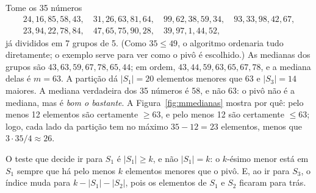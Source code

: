 \begin{exemplo}\label{ex:mmedianas}
Tome os 35 números
\[
\begin{array}{c}
24,16,85,58,43,\quad 31,26,63,81,64,\quad 99,62,38,59,34,\quad 93,33,98,42,67,\\
23,94,22,78,84,\quad 47,65,75,90,28,\quad 39,97,1,44,52,
\end{array}
\]
já divididos em 7 grupos de 5. (Como $35\le49$, o algoritmo ordenaria tudo diretamente; o exemplo serve para ver como o pivô é escolhido.) As medianas dos grupos são $43,63,59,67,78,65,44$; em ordem, $43,44,59,63,65,67,78$, e a mediana delas é $m=63$. A partição dá $|S_1|=20$ elementos menores que 63 e $|S_3|=14$ maiores. A mediana verdadeira dos 35 números é 58, e não 63: o pivô não é a mediana, mas é \emph{bom o bastante}. A Figura~\ref{fig:mmedianas} mostra por quê: pelo menos 12 elementos são certamente $\ge63$, e pelo menos 12 são certamente $\le63$; logo, cada lado da partição tem no máximo $35-12=23$ elementos, menos que $3\cdot35/4\approx26$.
\begin{figura}[Os grupos do Exemplo~\ref{ex:mmedianas}, cada um ordenado de cima (maior) para baixo (menor), com as colunas em ordem crescente de mediana. A linha do meio são as medianas, e o pivô $m=63$ está em azul. Em amarelo, 12 elementos que são certamente $\ge m$ (maiores ou iguais à mediana do seu grupo, que é $\ge m$); em verde, 12 que são certamente $\le m$. Os elementos brancos podem estar de qualquer lado.\label{fig:mmedianas}]
\end{figura}
\end{exemplo}

\begin{cuidado}
O teste que decide ir para $S_1$ é $|S_1|\ge k$, e não $|S_1|=k$: o $k$-ésimo menor está em $S_1$ sempre que há pelo menos $k$ elementos menores que o pivô. E, ao ir para $S_3$, o índice muda para $k-|S_1|-|S_2|$, pois os elementos de $S_1$ e $S_2$ ficaram para trás.
\end{cuidado}

